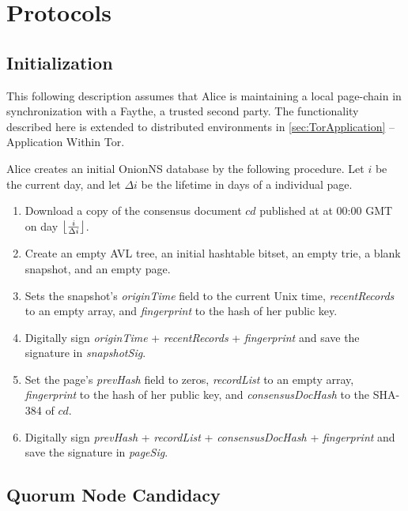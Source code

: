 \section{Protocols}
\label{sec:Protocols}

\subsection{Initialization}

This following description assumes that Alice is maintaining a local page-chain in synchronization with a Faythe, a trusted second party. The functionality described here is extended to distributed environments in \ref{sec:TorApplication} -- Application Within Tor.


Alice creates an initial OnionNS database by the following procedure. Let $ i $ be the current day, and let $ \Delta i $ be the lifetime in days of a individual page.

\begin{enumerate}
	\item Download a copy of the consensus document $ cd $ published at at 00:00 GMT on day $ \floor[\big]{\frac{i}{\Delta i}} $.
	\item Create an empty AVL tree, an initial hashtable bitset, an empty trie, a blank snapshot, and an empty page.
	\item Sets the snapshot's \emph{originTime} field to the current Unix time, \emph{recentRecords} to an empty array, and \emph{fingerprint} to the hash of her public key.
	\item Digitally sign {\emph{originTime} + \emph{recentRecords} + \emph{fingerprint}} and save the signature in \emph{snapshotSig}.
	\item Set the page's \emph{prevHash} field to zeros, \emph{recordList} to an empty array, \emph{fingerprint} to the hash of her public key, and \emph{consensusDocHash} to the SHA-384 of $ cd $.
	\item Digitally sign {\emph{prevHash} + \emph{recordList} + \emph{consensusDocHash} + \emph{fingerprint}} and save the signature in \emph{pageSig}.
\end{enumerate}

\subsection{Quorum Node Candidacy}

